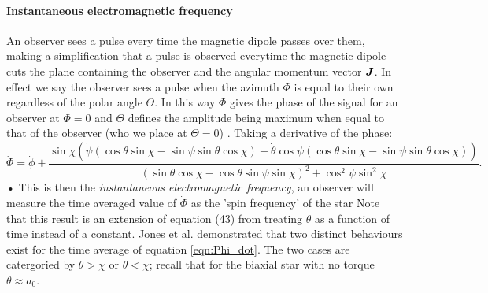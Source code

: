 \documentclass[11pt]{article}
\numberwithin{equation}{section}
\numberwithin{figure}{section}
\numberwithin{table}{section}
\begin{document}
\paragraph{Instantaneous electromagnetic frequency}
An observer sees a pulse every time the magnetic dipole passes over them, making a simplification that a pulse is observed everytime the magnetic dipole cuts the plane containing the observer and the angular momentum vector $\boldsymbol{J}$. In effect we say the observer sees a pulse when the azimuth $\Phi$ is equal to their own regardless of the polar angle $\Theta$. In this way $\Phi$ gives the phase of the signal for an observer at $\Phi=0$ and $\Theta$ defines the amplitude being maximum when equal to that of the observer (who we place at $\Theta= 0$) . %
Taking a derivative of the phase:
\begin{equation}
\dot{\Phi} = \dot{\phi} 
+ \frac{\sin\chi \left(
\dot{\psi}  (\cos\theta\sin\chi - \sin \psi \sin \theta \cos\chi) + 
\dot{\theta} \cos\psi (\cos\theta\sin\chi - \sin \psi \sin \theta \cos\chi)\right) 
}{(\sin\theta \cos \chi - \cos \theta \sin \psi \sin \chi)^{2} + \cos^{2}\psi \sin^{2} \chi}.
\label{eqn:Phi_dot}
\end{equation}•
This is then the \emph{instantaneous electromagnetic frequency},  an observer will measure the time averaged value of $\dot{\Phi}$ as the 'spin frequency' of the star
Note that this result is an extension of equation (43) from \cite{Jones2001} treating $\theta$ as a function of time instead of a constant. Jones et al. demonstrated that two distinct behaviours exist  for the time average of equation \eqref{eqn:Phi_dot}. The two cases are catergoried by $\theta > \chi$ or $\theta < \chi$; recall that for the biaxial star with no torque $\theta \approx a_{0}$.
\end{document}
